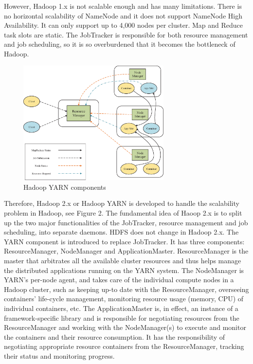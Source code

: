 However, Hadoop 1.x is not scalable enough and has many limitations. There is no horizontal scalability of NameNode and it does not support NameNode High Availability. It can only support up to 4,000 nodes per cluster. Map and Reduce task slots are static. The JobTracker is responsible for both resource management and job scheduling, so it is so overburdened that it becomes the bottleneck of Hadoop. 

\begin{figure}[t]
  \centering
  \includegraphics[width=3in]{figs/yarn.eps}
  \caption{Hadoop YARN components}
  \label{fig:overview}
\end{figure}

Therefore, Hadoop 2.x or Hadoop YARN is developed to handle the scalability problem in Hadoop, see Figure 2. The fundamental idea of Haoop 2.x is to split up the two major functionalities of the JobTracker, resource management and job scheduling, into separate daemons. HDFS does not change in Hadoop 2.x. The YARN component is introduced to replace JobTracker. It has three components: ResourceManager, NodeManager and ApplicationMaster. ResourceManager is the master that arbitrates all the available cluster resources and thus helps manage the distributed applications running on the YARN system. The NodeManager is YARN’s per-node agent, and takes care of the individual compute nodes in a Hadoop cluster, such as keeping up-to date with the ResourceManager, overseeing containers’ life-cycle management, monitoring resource usage (memory, CPU) of individual containers, etc. The ApplicationMaster is, in effect, an instance of a framework-specific library and is responsible for negotiating resources from the ResourceManager and working with the NodeManager(s) to execute and monitor the containers and their resource consumption. It has the responsibility of negotiating appropriate resource containers from the ResourceManager, tracking their status and monitoring progress.



